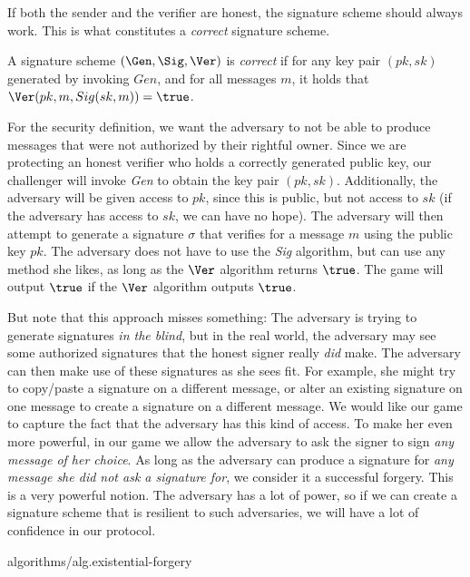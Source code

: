 If both the sender and the verifier are honest, the signature scheme should always
work. This is what constitutes a \emph{correct} signature scheme.

\begin{definition}
  A signature scheme $(\Gen, \Sig, \Ver)$ is \emph{correct} if
  for any key pair $(pk, sk)$ generated by invoking $Gen$, and
  for all messages $m$, it holds that $\Ver(pk, m, Sig(sk, m)) = \true$.
\end{definition}

For the security definition, we want the adversary to not be able to produce
messages that were not authorized by their rightful owner. Since we are protecting
an honest verifier who holds a correctly generated public key, our challenger will
invoke \emph{Gen} to obtain the key pair $(pk, sk)$. Additionally, the adversary will
be given access to $pk$, since this is public, but not access to $sk$ (if the adversary
has access to $sk$, we can have no hope). The adversary will then attempt to generate
a signature $\sigma$ that verifies for a message $m$ using the public key $pk$.
The adversary does not have to use the \emph{Sig} algorithm, but can use any method
she likes, as long as the $\Ver$ algorithm returns $\true$. The game will output
$\true$ if the $\Ver$ algorithm outputs $\true$.

But note that this approach misses something: The adversary is trying to generate
signatures \emph{in the blind}, but in the real world, the adversary may see some
authorized signatures that the honest signer really \emph{did} make. The adversary
can then make use of these signatures as she sees fit. For example, she might try
to copy/paste a signature on a different message, or alter an existing signature
on one message to create a signature on a different message. We would like our
game to capture the fact that the adversary has this kind of access. To make her
even more powerful, in our game we allow the adversary to ask the signer to sign
\emph{any message of her choice}. As long as the adversary can produce a signature
for \emph{any message she did not ask a signature for}, we consider it a successful
forgery. This is a very powerful notion. The adversary has a lot of power, so if
we can create a signature scheme that is resilient to such adversaries, we will have
a lot of confidence in our protocol.

{algorithms/alg.existential-forgery}

